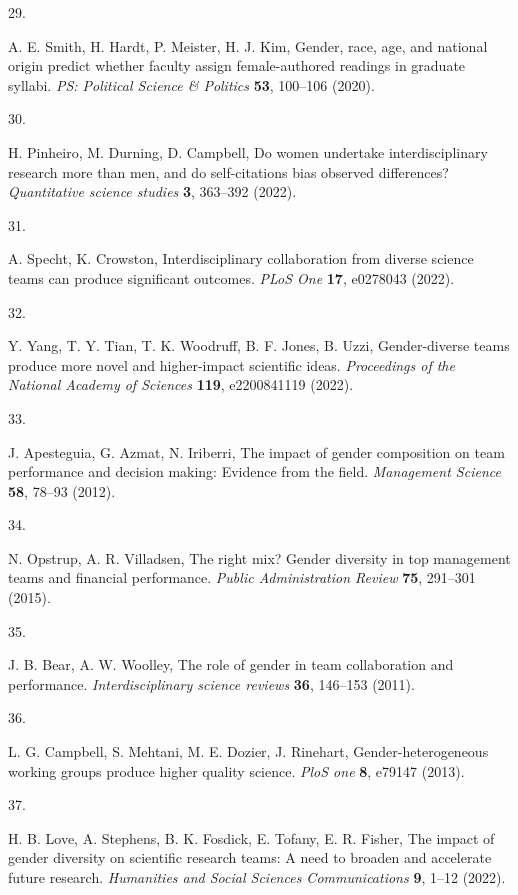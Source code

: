 \documentclass[
  11pt,
]{article}
\newlength{\cslhangindent}
\newlength{\csllabelwidth}
\newenvironment{CSLReferences}[2] %
 {\begin{list}{}{%
  \setlength{\itemindent}{0pt}
  \setlength{\leftmargin}{0pt}
  \setlength{\parsep}{0pt}
  \ifodd #1
   \setlength{\leftmargin}{\cslhangindent}
   \setlength{\itemindent}{-1\cslhangindent}
  \fi
  \setlength{\itemsep}{#2\baselineskip}}}
 {\end{list}}
\newcommand{\CSLLeftMargin}[1]{\parbox[t]{\csllabelwidth}{\strut#1\strut}}
\newcommand{\CSLRightInline}[1]{\parbox[t]{\linewidth - \csllabelwidth}{\strut#1\strut}}
\begin{document}
\begin{CSLReferences}{0}{1}
\CSLLeftMargin{29. }%
\CSLRightInline{A. E. Smith, H. Hardt, P. Meister, H. J. Kim, Gender, race, age, and national origin predict whether faculty assign female-authored readings in graduate syllabi. \emph{PS: Political Science \& Politics} \textbf{53}, 100--106 (2020).}

\CSLLeftMargin{30. }%
\CSLRightInline{H. Pinheiro, M. Durning, D. Campbell, Do women undertake interdisciplinary research more than men, and do self-citations bias observed differences? \emph{Quantitative science studies} \textbf{3}, 363--392 (2022).}

\CSLLeftMargin{31. }%
\CSLRightInline{A. Specht, K. Crowston, Interdisciplinary collaboration from diverse science teams can produce significant outcomes. \emph{PLoS One} \textbf{17}, e0278043 (2022).}

\CSLLeftMargin{32. }%
\CSLRightInline{Y. Yang, T. Y. Tian, T. K. Woodruff, B. F. Jones, B. Uzzi, Gender-diverse teams produce more novel and higher-impact scientific ideas. \emph{Proceedings of the National Academy of Sciences} \textbf{119}, e2200841119 (2022).}

\CSLLeftMargin{33. }%
\CSLRightInline{J. Apesteguia, G. Azmat, N. Iriberri, The impact of gender composition on team performance and decision making: Evidence from the field. \emph{Management Science} \textbf{58}, 78--93 (2012).}

\CSLLeftMargin{34. }%
\CSLRightInline{N. Opstrup, A. R. Villadsen, The right mix? Gender diversity in top management teams and financial performance. \emph{Public Administration Review} \textbf{75}, 291--301 (2015).}

\CSLLeftMargin{35. }%
\CSLRightInline{J. B. Bear, A. W. Woolley, The role of gender in team collaboration and performance. \emph{Interdisciplinary science reviews} \textbf{36}, 146--153 (2011).}

\CSLLeftMargin{36. }%
\CSLRightInline{L. G. Campbell, S. Mehtani, M. E. Dozier, J. Rinehart, Gender-heterogeneous working groups produce higher quality science. \emph{PloS one} \textbf{8}, e79147 (2013).}

\CSLLeftMargin{37. }%
\CSLRightInline{H. B. Love, A. Stephens, B. K. Fosdick, E. Tofany, E. R. Fisher, The impact of gender diversity on scientific research teams: A need to broaden and accelerate future research. \emph{Humanities and Social Sciences Communications} \textbf{9}, 1--12 (2022).}


\end{CSLReferences}
\end{document}
